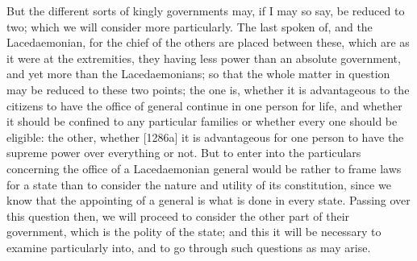 
But the different sorts of kingly governments may, if I may so say, be
reduced to two; which we will consider more particularly. The last spoken
of, and the Lacedaemonian, for the chief of the others are placed between
these, which are as it were at the extremities, they having less power
than an absolute government, and yet more than the Lacedaemonians; so that
the whole matter in question may be reduced to these two points; the one
is, whether it is advantageous to the citizens to have the office of
general continue in one person for life, and whether it should be confined
to any particular families or whether every one should be eligible: the
other, whether [1286a] it is advantageous for one person to have the
supreme power over everything or not. But to enter into the particulars
concerning the office of a Lacedaemonian general would be rather to frame
laws for a state than to consider the nature and utility of its
constitution, since we know that the appointing of a general is what is
done in every state. Passing over this question then, we will proceed to
consider the other part of their government, which is the polity of the
state; and this it will be necessary to examine particularly into, and to
go through such questions as may arise.

